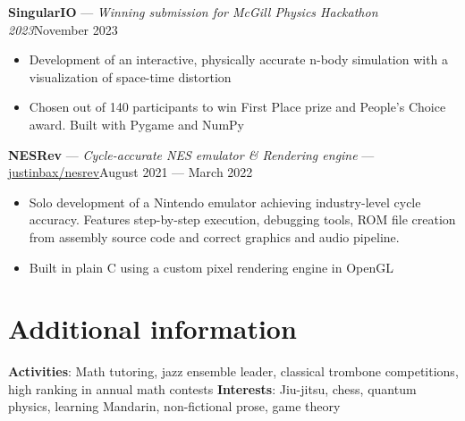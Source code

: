 \documentclass{article}
\newcommand{\shortrole}[3]{
    {\normalfont\textbf{#1} --- \textit{#2}\hfill#3\vspace*{-4pt}}
}
\newcommand{\shortlinkrole}[5]{
    {\normalfont\textbf{#1} --- \textit{#2} --- \href{#3}{#4}\hfill#5\vspace*{-4pt}}
}
\newenvironment{bulletpoints}{\begin{itemize}\setlength\itemsep{-0.3em}}{\end{itemize}}
\begin{document}
\shortrole{SingularIO}{Winning submission for McGill Physics Hackathon 2023}{November 2023}
\begin{bulletpoints}
    \item Development of an interactive, physically accurate n-body simulation with a visualization of space-time distortion
    \item Chosen out of 140 participants to win First Place prize and People’s Choice award. Built with Pygame and NumPy
\end{bulletpoints}

\shortlinkrole{NESRev}{Cycle-accurate NES emulator \& Rendering engine}{https://github.com/justinbax/nesrev}{justinbax/nesrev}{August 2021 --- March 2022}
\begin{bulletpoints}
    \item Solo development of a Nintendo emulator achieving industry-level cycle accuracy. Features step-by-step execution, debugging tools, ROM file creation from assembly source code and correct graphics and audio pipeline.
    \item Built in plain C using a custom pixel rendering engine in OpenGL
\end{bulletpoints}


\section*{Additional information}
{\bfseries Activities}: Math tutoring, jazz ensemble leader, classical trombone competitions, high ranking in annual math contests
\newline
{\bfseries Interests}: Jiu-jitsu, chess, quantum physics, learning Mandarin, non-fictional prose, game theory
\end{document}
